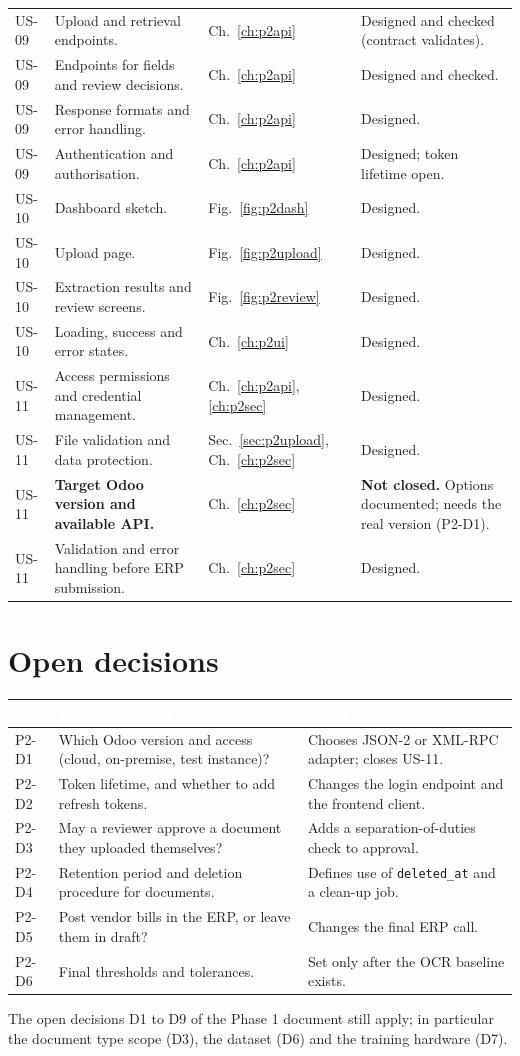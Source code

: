 \documentclass[11pt,a4paper]{report}
\newcommand{\hdr}[1]{\textcolor{white}{\sffamily\bfseries #1}}
\newcommand{\tblstart}{\rowcolors{2}{white}{rowgray}\arrayrulecolor{teal!60}}
\newcommand{\hdrrow}{\rowcolor{navy}}
\begin{document}
{\begin{longtable}{L{1.1cm}L{5.0cm}L{2.0cm}L{5.7cm}}
US-09 & Upload and retrieval endpoints. & Ch.~\ref{ch:p2api} & Designed and checked (contract validates).\\
US-09 & Endpoints for fields and review decisions. & Ch.~\ref{ch:p2api} & Designed and checked.\\
US-09 & Response formats and error handling. & Ch.~\ref{ch:p2api} & Designed.\\
US-09 & Authentication and authorisation. & Ch.~\ref{ch:p2api} & Designed; token lifetime open.\\
US-10 & Dashboard sketch. & Fig.~\ref{fig:p2dash} & Designed.\\
US-10 & Upload page. & Fig.~\ref{fig:p2upload} & Designed.\\
US-10 & Extraction results and review screens. & Fig.~\ref{fig:p2review} & Designed.\\
US-10 & Loading, success and error states. & Ch.~\ref{ch:p2ui} & Designed.\\
US-11 & Access permissions and credential management. & Ch.~\ref{ch:p2api}, \ref{ch:p2sec} & Designed.\\
US-11 & File validation and data protection. & Sec.~\ref{sec:p2upload}, Ch.~\ref{ch:p2sec} & Designed.\\
US-11 & \textbf{Target Odoo version and available API.} & Ch.~\ref{ch:p2sec} & \textbf{Not closed.} Options documented; needs the real version (P2-D1).\\
US-11 & Validation and error handling before ERP submission. & Ch.~\ref{ch:p2sec} & Designed.\\
\hline
\end{longtable}}

\section{Open decisions}\label{sec:p2open}
{\tblstart\small
\begin{longtable}{L{1.4cm}L{6.4cm}L{6.0cm}}
\hdrrow \hdr{ID} & \hdr{Decision needed} & \hdr{Effect}\\ \endhead
P2-D1 & Which Odoo version and access (cloud, on-premise, test instance)? & Chooses JSON-2 or XML-RPC adapter; closes US-11.\\
P2-D2 & Token lifetime, and whether to add refresh tokens. & Changes the login endpoint and the frontend client.\\
P2-D3 & May a reviewer approve a document they uploaded themselves? & Adds a separation-of-duties check to approval.\\
P2-D4 & Retention period and deletion procedure for documents. & Defines use of \texttt{deleted\_at} and a clean-up job.\\
P2-D5 & Post vendor bills in the ERP, or leave them in draft? & Changes the final ERP call.\\
P2-D6 & Final thresholds and tolerances. & Set only after the OCR baseline exists.\\
\hline
\end{longtable}}
The open decisions D1 to D9 of the Phase 1 document still apply; in particular the document type scope (D3), the dataset (D6) and the training hardware (D7).
\end{document}
